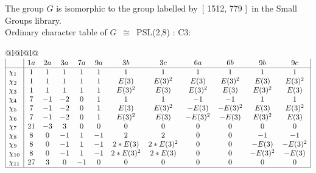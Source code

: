 \documentclass[varwidth=\maxdimen,border=10]{standalone}
\begin{document}
The group $G$ is isomorphic to the group labelled by\ [ 1512, 779 ]\ in the Small Groups library.\\
Ordinary character table of $G$\ $\cong$\ PSL(2,8) : C3:\\
\begin{center}
\begin{tabular}{@{}l@{}l@{}l@{}}
\hline
\(\begin{array}{|l|ccccccccccc|}
  & 1a & 2a & 3a & 7a & 9a & 3b & 3c & 6a & 6b & 9b & 9c\\ \hline
\chi_{1} & 1 & 1 & 1 & 1 & 1 & 1 & 1 & 1 & 1 & 1 & 1\\
\chi_{2} & 1 & 1 & 1 & 1 & 1 & E(3) & E(3)^{2} & E(3) & E(3)^{2} & E(3) & E(3)^{2}\\
\chi_{3} & 1 & 1 & 1 & 1 & 1 & E(3)^{2} & E(3) & E(3)^{2} & E(3) & E(3)^{2} & E(3)\\
\chi_{4} & 7 & -1 & -2 & 0 & 1 & 1 & 1 & -1 & -1 & 1 & 1\\
\chi_{5} & 7 & -1 & -2 & 0 & 1 & E(3) & E(3)^{2} & -E(3) & -E(3)^{2} & E(3) & E(3)^{2}\\
\chi_{6} & 7 & -1 & -2 & 0 & 1 & E(3)^{2} & E(3) & -E(3)^{2} & -E(3) & E(3)^{2} & E(3)\\
\chi_{7} & 21 & -3 & 3 & 0 & 0 & 0 & 0 & 0 & 0 & 0 & 0\\
\chi_{8} & 8 & 0 & -1 & 1 & -1 & 2 & 2 & 0 & 0 & -1 & -1\\
\chi_{9} & 8 & 0 & -1 & 1 & -1 & 2*E(3) & 2*E(3)^{2} & 0 & 0 & -E(3) & -E(3)^{2}\\
\chi_{10} & 8 & 0 & -1 & 1 & -1 & 2*E(3)^{2} & 2*E(3) & 0 & 0 & -E(3)^{2} & -E(3)\\
\chi_{11} & 27 & 3 & 0 & -1 & 0 & 0 & 0 & 0 & 0 & 0 & 0\\
\hline
\end{array}\)\\
\end{tabular}
\end{center}
\end{document}
